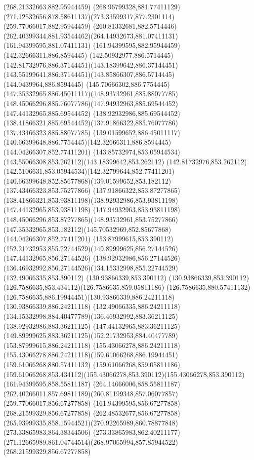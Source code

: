 {{\lineto(268.21332663,882.95944459)
\curveto(268.96799328,881.77411129)(271.12532656,878.58611137)(273.33599317,877.2301114)
\moveto(259.77066017,882.95944459)
\curveto(260.81332681,882.5714446)(262.40399344,881.93544462)(264.14932673,881.07411131)
\lineto(161.94399595,881.07411131)
\lineto(161.94399595,882.95944459)
\closepath
\moveto(142.32666311,886.8594445)
\curveto(142.50932977,886.5714445)(142.81732976,886.37144451)(143.18399642,886.37144451)
\curveto(143.55199641,886.37144451)(143.85866307,886.5714445)(144.0439964,886.8594445)
\curveto(145.70666302,886.7754445)(147.35332965,886.45011117)(148.93732961,885.88077785)
\curveto(148.45066296,885.76077786)(147.94932963,885.69544452)(147.44132965,885.69544452)
\lineto(138.92932986,885.69544452)
\curveto(138.41866321,885.69544452)(137.91866322,885.76077786)(137.43466323,885.88077785)
\curveto(139.01599652,886.45011117)(140.66399648,886.7754445)(142.32666311,886.8594445)
\moveto(144.04266307,852.77411201)
\curveto(143.85732974,853.05944534)(143.55066308,853.262112)(143.18399642,853.262112)
\curveto(142.81732976,853.262112)(142.5106631,853.05944534)(142.32799644,852.77411201)
\curveto(140.66399648,852.85677868)(139.01599652,853.182112)(137.43466323,853.75277866)
\curveto(137.91866322,853.87277865)(138.41866321,853.93811198)(138.92932986,853.93811198)
\lineto(147.44132965,853.93811198)
\curveto(147.94932963,853.93811198)(148.45066296,853.87277865)(148.93732961,853.75277866)
\curveto(147.35332965,853.182112)(145.70532969,852.85677868)(144.04266307,852.77411201)
\moveto(153.87999615,853.390112)
\curveto(152.21732953,855.22744529)(149.89999625,856.27144526)(147.44132965,856.27144526)
\lineto(138.92932986,856.27144526)
\curveto(136.46932992,856.27144526)(134.15332998,855.22744529)(132.49066335,853.390112)
\lineto(130.93866339,853.390112)
\curveto(130.93866339,853.390112)(126.7586635,853.434112)(126.7586635,859.05811186)
\lineto(126.7586635,880.57411132)
\curveto(126.7586635,886.19944451)(130.93866339,886.24211118)(130.93866339,886.24211118)
\lineto(132.49066335,886.24211118)
\curveto(134.15332998,884.40477789)(136.46932992,883.36211125)(138.92932986,883.36211125)
\lineto(147.44132965,883.36211125)
\curveto(149.89999625,883.36211125)(152.21732953,884.40477789)(153.87999615,886.24211118)
\lineto(155.43066278,886.24211118)
\curveto(155.43066278,886.24211118)(159.61066268,886.19944451)(159.61066268,880.57411132)
\lineto(159.61066268,859.05811186)
\curveto(159.61066268,853.434112)(155.43066278,853.390112)(155.43066278,853.390112)
\closepath
\moveto(161.94399595,858.55811187)
\lineto(264.14666006,858.55811187)
\curveto(262.40266011,857.69811189)(260.81199348,857.06077857)(259.77066017,856.67277858)
\lineto(161.94399595,856.67277858)
\closepath
\moveto(268.21599329,856.67277858)
\lineto(262.48532677,856.67277858)
\curveto(265.93999335,858.15944521)(270.92265989,860.78877848)(273.33865983,864.38344506)
\lineto(273.33865983,862.40211177)
\curveto(271.12665989,861.04744514)(268.97065994,857.85944522)(268.21599329,856.67277858)
}
}
